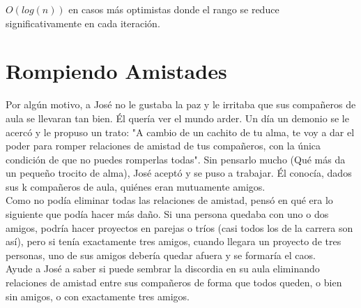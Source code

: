 \documentclass[
10pt, %
a4paper, %
oneside, %
headinclude,footinclude, %
BCOR5mm, %
]{scrartcl}
\begin{document}
$O(log(n))$ en casos más optimistas donde el rango se reduce significativamente en cada iteración.

\section{Rompiendo Amistades}

Por algún motivo, a José no le gustaba la paz y le irritaba que sus compañeros de aula se llevaran tan bien. Él quería ver
el mundo arder. Un día un demonio se le acercó y le propuso un trato: "A cambio de un cachito de tu alma, te voy a dar el poder para
romper relaciones de amistad de tus compañeros, con la única condición de que no puedes romperlas todas". Sin pensarlo mucho (Qué más
da un pequeño trocito de alma), José aceptó y se puso a trabajar. Él conocía, dados sus k compañeros de aula, quiénes eran mutuamente
amigos.\\

Como no podía eliminar todas las relaciones de amistad, pensó en qué era lo siguiente que podía hacer más daño. Si una persona quedaba con
uno o dos amigos, podría hacer proyectos en parejas o tríos (casi todos los de la carrera son así), pero si tenía exactamente tres amigos,
cuando llegara un proyecto de tres personas, uno de sus amigos debería quedar afuera y se formaría el caos. \\

Ayude a José a saber si puede sembrar la discordia en su aula eliminando relaciones de amistad entre sus compañeros de forma que todos queden, o bien sin amigos, o con exactamente tres amigos.






\end{document}
